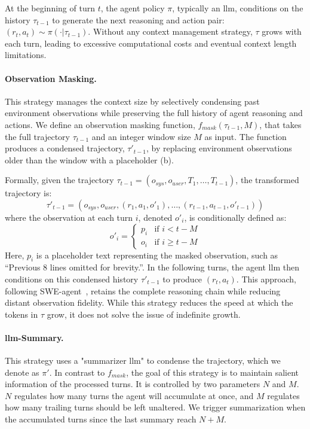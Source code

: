 \documentclass{article}
\begin{document}
At the beginning of turn $t$, the agent policy $\pi$, typically an \ac{llm}, conditions on the history $\tau_{t-1}$ to generate the next reasoning and action pair: $(r_t, a_t) \sim \pi(\cdot|\tau_{t-1})$. Without any context management strategy, $\tau$ grows with each turn, leading to excessive computational costs and eventual context length limitations.

\paragraph{Observation Masking.}
This strategy manages the context size by selectively condensing past environment observations while preserving the full history of agent reasoning and actions. We define an observation masking function, $f_{mask}(\tau_{t-1}, M)$, that takes the full trajectory $\tau_{t-1}$ and an integer window size $M$ as input. The function produces a condensed trajectory, $\tau'_{t-1}$, by replacing environment observations older than the window with a placeholder (b).

Formally, given the trajectory $\tau_{t-1} = (o_{sys}, o_{user}, T_1, \dots, T_{t-1})$, the transformed trajectory is:
\begin{equation}
\tau'_{t-1} = (o_{sys}, o_{user}, (r_1, a_1, o'_1), \dots, (r_{t-1}, a_{t-1}, o'_{t-1}))
\end{equation}
where the observation at each turn $i$, denoted $o'_i$, is conditionally defined as:
\begin{equation}
\label{eq:rolling_window}
o'_i = 
\begin{cases} 
      p_i & \text{if } i < t-M \\
      o_i & \text{if } i \geq t-M
\end{cases}
\end{equation}
Here, $p_{i}$ is a placeholder text representing the masked observation, such as ``Previous 8 lines omitted for brevity.''. In the following turns, the agent \ac{llm} then conditions on this condensed history $\tau'_{t-1}$ to produce $(r_t, a_t)$. This approach, following SWE-agent~\cite{yang_swe-agent_2024}, retains the complete reasoning chain while reducing distant observation fidelity. While this strategy reduces the speed at which the tokens in $\tau$ grow, it does not solve the issue of indefinite growth.

\paragraph{\ac{llm}-Summary.}
This strategy uses a "summarizer \ac{llm}" to condense the trajectory, which we denote as $\pi'$. In contrast to $f_{mask}$, the goal of this strategy is to maintain salient information of the processed turns. It is controlled by two parameters $N$ and $M$. $N$ regulates how many turns the agent will accumulate at once, and $M$ regulates how many trailing turns should be left unaltered. We trigger summarization when the accumulated turns since the last summary reach $N+M$. 
\end{document}
